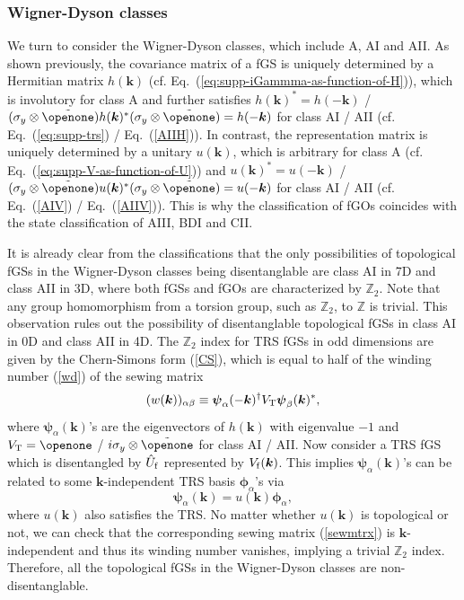 \documentclass[prl,twocolumn,preprintnumbers,superscriptaddress,amsmath,amssymb]{revtex4-1}
\begin{document}
\subsubsection{Wigner-Dyson classes}
We turn to consider the Wigner-Dyson classes, which include A, AI and AII. As shown previously, the covariance matrix of a fGS is uniquely determined by a Hermitian matrix $h(\boldsymbol{k})$ (cf. Eq.~(\ref{eq:supp-iGammma-as-function-of-H})), which is involutory for class A and further satisfies $h(\boldsymbol{k})^* = h(-\boldsymbol{k})$ / $(\sigma_y\otimes\tilde\openone) h(\boldsymbol{k})^*(\sigma_y\otimes\tilde\openone) = h(-\boldsymbol{k})$ for class AI / AII (cf. Eq.~(\ref{eq:supp-trs}) / Eq.~(\ref{AIIH})). In contrast, the representation matrix is uniquely determined by a unitary $u(\boldsymbol{k})$, which is arbitrary for class A (cf. Eq.~(\ref{eq:supp-V-as-function-of-U})) and $u(\boldsymbol{k})^* = u(-\boldsymbol{k})$ / $(\sigma_y\otimes\tilde\openone) u(\boldsymbol{k})^*(\sigma_y\otimes\tilde\openone) = u(-\boldsymbol{k})$ for class AI / AII (cf. Eq.~(\ref{AIV}) / Eq.~(\ref{AIIV})). This is why the classification of fGOs coincides with the state classification of AIII, BDI and CII.

It is already clear from the classifications that the only possibilities of topological fGSs in the Wigner-Dyson classes being disentanglable are class AI in 7D and class AII in 3D, where both fGSs and fGOs are characterized by $\mathbb{Z}_2$. Note that any group homomorphism from a torsion group, such as $\mathbb{Z}_2$, to $\mathbb{Z}$ is trivial. This observation rules out the possibility of disentanglable topological fGSs in class AI in 0D and class AII in 4D. The $\mathbb{Z}_2$ index for TRS fGSs in odd dimensions are %
given by the Chern-Simons form (\ref{CS}), which is equal to half of the winding number (\ref{wd}) of the sewing matrix
\begin{equation}
(w(\boldsymbol{k}))_{\alpha\beta}\equiv \boldsymbol{\psi}_\alpha(-\boldsymbol{k})^\dag V_{\rm T}\boldsymbol{\psi}_\beta(\boldsymbol{k})^*,
\label{sewmtrx}
\end{equation}
where $\boldsymbol{\psi}_\alpha(\boldsymbol{k})$'s are the eigenvectors of $h(\boldsymbol{k})$ with eigenvalue $-1$ and $V_{\rm T}=\openone$ / $i\sigma_y\otimes\tilde\openone$ for class AI / AII. Now consider a TRS fGS which is disentangled by $\hat U_{\rm f}$ represented by $V_{\rm f}(\boldsymbol{k})$. This implies $\boldsymbol{\psi}_\alpha(\boldsymbol{k})$'s can be related to some $\boldsymbol{k}$-independent TRS basis $\boldsymbol{\phi}_\alpha$'s via
\begin{equation}
\boldsymbol{\psi}_\alpha(\boldsymbol{k})= u(\boldsymbol{k})\boldsymbol{\phi}_\alpha,
\end{equation}
where $u(\boldsymbol{k})$ also satisfies the TRS. No matter whether $u(\boldsymbol{k})$ is topological or not, we can check that the corresponding sewing matrix (\ref{sewmtrx}) is $\boldsymbol{k}$-independent and thus its winding number vanishes, implying a trivial $\mathbb{Z}_2$ index. Therefore, all the topological fGSs in the Wigner-Dyson classes are non-disentanglable. 
\end{document}
